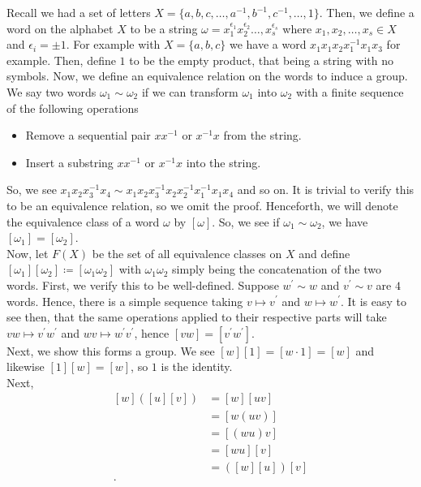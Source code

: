 Recall we had a set of letters \(X = \{a, b, c, \ldots, a^{-1}, b^{-1}, c^{-1}, \ldots,  1 \}\). Then, we define a word on the alphabet \(X\) to be a string \(\omega = x_1^{\epsilon_1} x_2^{\epsilon_2} \ldots, x_{s}^{\epsilon_{s}}\) where \(x_1, x_2, \ldots, x_{s} \in X\) and \(\epsilon _{i} = \pm 1\). For example with \(X = \{a, b, c\} \) we have a word \(x_1 x_1 x_2 x_1^{-1} x_1 x_3\) for example. Then, define \(1\) to be the empty product, that being a string with no symbols. Now, we define an equivalence relation on the words to induce a group.\\
We say two words \(\omega_1 \sim \omega_2\) if we can transform \(\omega_1\) into \(\omega_2\) with a finite sequence of the following operations
\begin{itemize}
	\item Remove a sequential pair \(x x^{-1}\) or \(x^{-1} x\) from the string.
	\item Insert a substring \(x x^{-1}\) or \(x^{-1} x\) into the string.
\end{itemize}
So, we see \(x_1x_2x_3^{-1}x_4 \sim x_1x_2x_3^{-1}x_2x_2^{-1} x_1^{-1} x_1 x_4\) and so on. It is trivial to verify this to be an equivalence relation, so we omit the proof. Henceforth, we will denote the equivalence class of a word \(\omega\) by \(\left[ \omega \right] \). So, we see if \( \omega_1 \sim \omega_2\), we have \(\left[ \omega_1 \right]  = \left[ \omega_2 \right] \).\\
Now, let \(F\left( X \right) \) be the set of all equivalence classes on \(X\) and define \(\left[ \omega_1 \right] \left[ \omega_2 \right]  \coloneqq \left[ \omega_1\omega_2 \right]  \) with \(\omega_1 \omega_2\) simply being the concatenation of the two words. First, we verify this to be well-defined. Suppose \(w^{\prime} \sim w\) and \(v^{\prime} \sim v\) are \(4\) words. Hence, there is a simple sequence taking \(v \mapsto v^{\prime}\) and \(w \mapsto w^{\prime}\). It is easy to see then, that the same operations applied to their respective parts will take \(vw \mapsto v^{\prime} w^{\prime}\) and \(wv \mapsto w^{\prime} v^{\prime}\), hence \(\left[ vw \right]  = \left[ v^{\prime} w^{\prime} \right] \).\\
Next, we show this forms a group. We see \(\left[ w \right] \left[ 1 \right]  = \left[ w \cdot 1 \right] = \left[ w \right]  \) and likewise \(\left[ 1 \right] \left[ w \right] = \left[ w \right] \), so \(1\) is the identity.\\
Next,
\begin{align*}
	\left[ w \right] \left( \left[ u \right] \left[ v \right]  \right) &=  \left[ w \right] \left[ uv \right]  \\
									   &= \left[ w(uv) \right]  \\
	&= \left[ \left( wu \right) v \right]  \\
	&= \left[ wu \right] \left[ v \right]  \\
	&= \left( \left[ w \right] \left[ u \right]  \right) \left[ v \right]  \\
.\end{align*}
